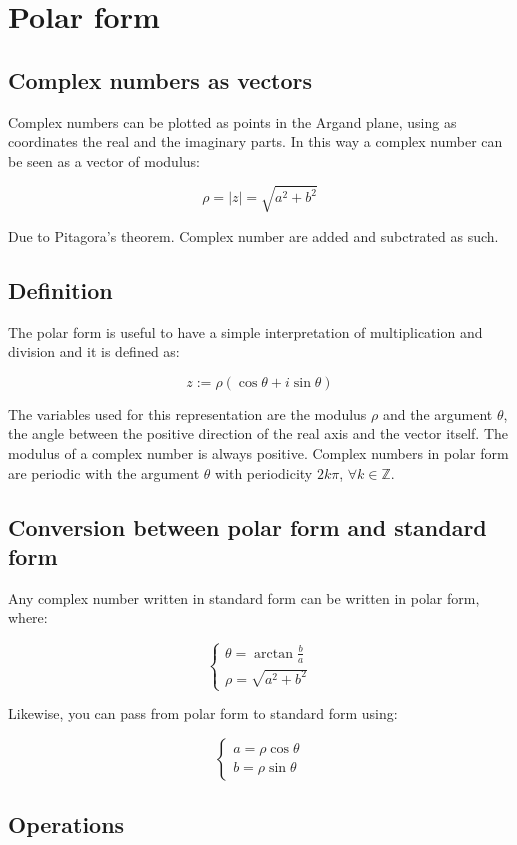 \section{Polar form}

	\subsection{Complex numbers as vectors}
	Complex numbers can be plotted as points in the Argand plane, using as coordinates the real and the imaginary parts.
	In this way a complex number can be seen as a vector of modulus:

	$$\rho = |z| = \sqrt{a^2+b^2}$$

	Due to Pitagora's theorem.
	Complex number are added and subctrated as such.

	\subsection{Definition}
	The polar form is useful to have a simple interpretation of multiplication and division and it is defined as:

	$$z :=\rho(\cos\theta + i\sin\theta)$$

	The variables used for this representation are the modulus $\rho$ and the argument $\theta$, the angle between the positive direction of the real axis and the vector itself.
	The modulus of a complex number is always positive.
	Complex numbers in polar form are periodic with the argument $\theta$ with periodicity $2k\pi$, $\forall k\in\mathbb{Z}$.

	\subsection{Conversion between polar form and standard form}
	Any complex number written in standard form can be written in polar form, where:

	$$\begin{cases}
		\theta = \arctan \frac{b}{a}\\
		\rho = \sqrt{a^2 + b^2}
	\end{cases}$$

	Likewise, you can pass from polar form to standard form using:

	$$\begin{cases}
		a = \rho\cos\theta\\
		b = \rho\sin\theta
	\end{cases}$$
   
	\subsection{Operations}


